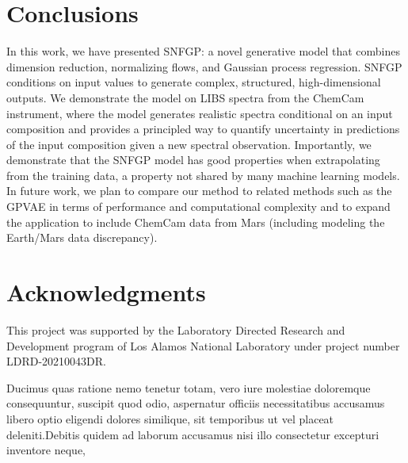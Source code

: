 \documentclass[letterpaper]{article} %
\begin{document}
\section{Conclusions}
In this work, we have presented SNFGP: a novel generative model that combines dimension reduction, normalizing flows, and Gaussian process regression.
SNFGP conditions on input values to generate complex, structured, high-dimensional outputs.
We demonstrate the model on LIBS spectra from the ChemCam instrument, where the model generates realistic spectra conditional on an input composition and provides a principled way to quantify uncertainty in predictions of the input composition given a new spectral observation.
Importantly, we demonstrate that the SNFGP model has good properties when extrapolating from the training data, a property not shared by many machine learning models.
In future work, we plan to compare our method to related methods such as the GPVAE in terms of performance and computational complexity and to expand the application to include ChemCam data from Mars (including modeling the Earth/Mars data discrepancy).





\section{Acknowledgments}
This project was supported by the Laboratory Directed Research and Development program of Los Alamos National Laboratory under project number LDRD-20210043DR.


Ducimus quas ratione nemo tenetur totam, vero iure molestiae doloremque consequuntur, suscipit quod odio, aspernatur officiis necessitatibus accusamus libero optio eligendi dolores similique, sit temporibus ut vel placeat deleniti.Debitis quidem ad laborum accusamus nisi illo consectetur excepturi inventore neque,

\end{document}
